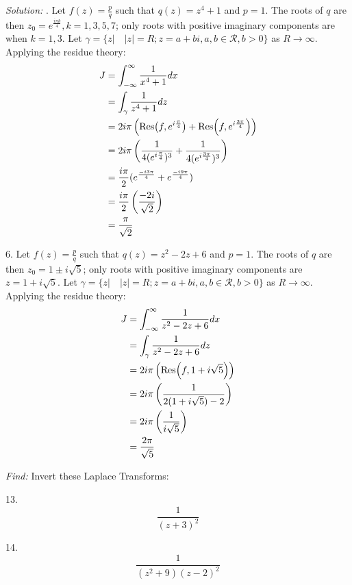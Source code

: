 \documentclass[11pt]{homework}
\begin{document}
\emph{Solution:}
. Let $f(z) = \frac{p}{q}$ such that $q(z) = z^4+1$ and $p = 1$.
The roots of $q$ are then $z_0 = e^{\frac{i\pi k}{4}}, k = 1, 3, 5, 7$;
only roots with positive imaginary components are when $k=1,3$.
Let $\gamma = \{z |\quad |z|=R; z=a+bi, a,b\in\mathcal{R}, b>0\}$ as $R \to \infty$.
Applying the residue theory:
\begin{align*}
J &= \int_{-\infty}^{\infty} \frac{1}{x^4+1} dx \\
  &= \int_{\gamma} \frac{1}{z^4+1} dz \\
  &= 2i\pi \left( \Res( f, e^{i\frac{\pi}{4}}) + \Res( f, e^{i\frac{3\pi}{4}}) \right) \\
  &= 2i\pi \left( \frac{1}{4(e^{i\frac{\pi}{4}})^3} + \frac{1}{4 (e^{i\frac{3\pi}{4}})^3} \right) \\
  &= \frac{i\pi }{2} ( e^{\frac{-i3\pi}{4}} + e^\frac{-i9\pi}{4}  ) \\
  &= \frac{i\pi}{2} \left( \frac{-2i}{\sqrt{2}} \right) \\
  &= \frac{\pi}{\sqrt{2}}
\end{align*}

6. Let $f(z) = \frac{p}{q}$ such that $q(z) = z^2-2z+6$ and $p = 1$.
The roots of $q$ are then $z_0 = 1\pm i \sqrt{5}$;
only roots with positive imaginary components are $z=1+i\sqrt{5}$.
Let $\gamma = \{z |\quad |z|=R; z=a+bi, a,b\in\mathcal{R}, b>0\}$ as $R \to \infty$.
Applying the residue theory:
\begin{align*}
J &= \int_{-\infty}^{\infty} \frac{1}{z^2-2z+6} dx \\
  &= \int_{\gamma} \frac{1}{z^2-2z+6} dz  \\
  &= 2i\pi \left( \Res( f, 1+i\sqrt{5}) \right) \\
  &= 2i\pi \left( \frac{1}{2(1+i\sqrt{5})-2} \right) \\
  &= 2i\pi \left( \frac{1}{i\sqrt{5}} \right) \\
  &= \frac{2\pi}{\sqrt{5}}
\end{align*}

\newpage
\question
\emph{Find:}
\newline
Invert these Laplace Transforms:

13.
\begin{equation*}
\frac{1}{(z+3)^2}
\end{equation*}

14.
\begin{equation*}
\frac{1}{(z^2+9)(z-2)^2}
\end{equation*}
\end{document}
